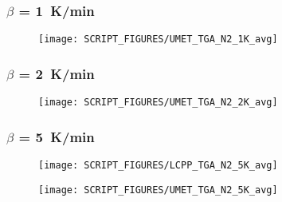 \subsubsection{$\beta$ = 1~K/min}
\begin{minipage}{0.5\textwidth}
\begin{figure}[H]
{\texttt{[image: SCRIPT\_FIGURES/UMET\_TGA\_N2\_1K\_avg]}}\\
\end{figure}
\end{minipage}
\subsubsection{$\beta$ = 2~K/min}
\begin{minipage}{0.5\textwidth}
\begin{figure}[H]
{\texttt{[image: SCRIPT\_FIGURES/UMET\_TGA\_N2\_2K\_avg]}}\\
\end{figure}
\end{minipage} 
\vfill 
\subsubsection{$\beta$ = 5~K/min}
\begin{minipage}{0.5\textwidth}
\begin{figure}[H]
{\texttt{[image: SCRIPT\_FIGURES/LCPP\_TGA\_N2\_5K\_avg]}}\\
\end{figure}
\end{minipage} 
\begin{minipage}{0.35\textwidth}
\begin{figure}[H]
{\texttt{[image: SCRIPT\_FIGURES/UMET\_TGA\_N2\_5K\_avg]}}\\
\end{figure}
\end{minipage}
\vfill 
\newpage
